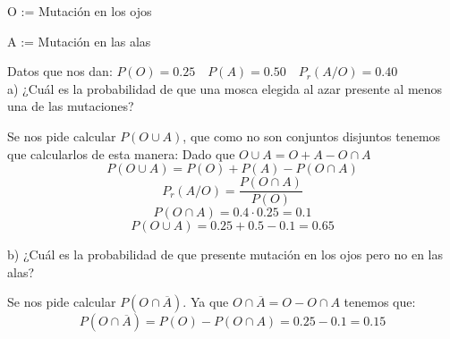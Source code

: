 O := Mutación en los ojos

A := Mutación en las alas

Datos que nos dan: $P(O) = 0.25 \quad P(A) = 0.50 \quad P_r(A/O) = 0.40$\\

a) ¿Cuál es la probabilidad de que una mosca elegida al azar presente al menos una de las mutaciones?

Se nos pide calcular $P(O \cup A)$, que como no son conjuntos disjuntos tenemos que calcularlos de esta manera: Dado que $O \cup A = O + A - O \cap A$ \\
$$P(O \cup A) = P(O) + P(A) - P(O \cap A)$$
$$P_r(A/O) = \dfrac{P(O \cap A)}{P(O)}$$
$$P(O \cap A) = 0.4 \cdot 0.25 = 0.1$$
$$P(O \cup A) = 0.25 + 0.5 - 0.1 = 0.65$$

b) ¿Cuál es la probabilidad de que presente mutación en los ojos pero no en las alas?

Se nos pide calcular $P(O \cap \overline{A})$. Ya que $O \cap \overline{A} = O - O \cap A$ tenemos que:
$$P(O \cap \overline{A}) = P(O) - P(O \cap A) = 0.25 - 0.1 = 0.15$$
